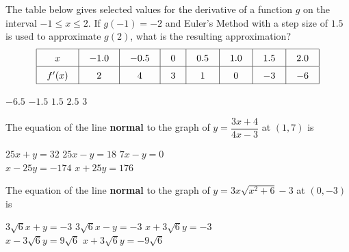 \begin{questions}
    \question The table below gives selected values for the derivative of a function $g$ on the interval $-1 \leq x \leq 2$. If $g(-1) = -2$ and Euler's Method with a step size of $1.5$ is used to approximate $g(2)$, what is the resulting approximation? \begin{align*}
        \arraycolsep=11pt\def\arraystretch{1.5}
        \begin{array}{|c|c|c|c|c|c|c|c|}
            \hline
            x & -1.0 & -0.5 & 0 & 0.5 & 1.0 & 1.5 & 2.0 \\ \hline
            f'(x) & 2 & 4 & 3 & 1 & 0 & -3 & -6 \\
            \hline
        \end{array}
    \end{align*}

    \begin{oneparchoices}
        \choice $-6.5$
        \choice $-1.5$
        \choice $1.5$
        \choice $2.5$
        \choice $3$
    \end{oneparchoices} \par \horizontalline

    \question The equation of the line \textbf{normal} to the graph of $y = \dfrac{3x + 4}{4x - 3}$ at $(1, 7)$ is \\

    \begin{oneparchoices}
        \choice $25x + y = 32$ 
        \choice $25x - y = 18$
        \choice $7x - y = 0$ \\[11pt]
        \makebox[0.23\textwidth] \choice $x - 25y = -174$ 
        \makebox[0.23\textwidth] \choice $x + 25y = 176$
    \end{oneparchoices} \par \horizontalline

    \question The equation of the line \textbf{normal} to the graph of $y = 3x\sqrt{x^2 + 6} - 3$ at $(0, -3)$ is \\

    \begin{oneparchoices}
        \choice $3\sqrt{6}x + y = -3$
        \choice $3\sqrt{6}x - y = -3$
        \choice $x + 3\sqrt{6}y = -3$ \\[11pt]
        \makebox[0.2\textwidth] \choice $x - 3\sqrt{6}y = 9\sqrt{6}$
        \makebox[0.23\textwidth] \choice $x + 3\sqrt{6}y = -9\sqrt{6}$
    \end{oneparchoices} \par \horizontalline
\end{questions}